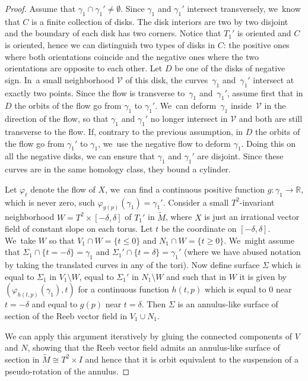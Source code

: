 \documentclass[10pt]{amsart}
\theoremstyle{definition}
\begin{document}
\begin{proof}
Assume that $\gamma_1\cap \gamma_1' \neq \emptyset$. Since $\gamma_1$ and $\gamma_1'$ intersect transversely, we~know that $C$ is a finite collection of disks. The disk interiors are two by two disjoint and the boundary of each disk has two corners. Notice that $T_1'$ is oriented and $C$ is oriented, hence we can distinguish two types of disks in $C$: the positive ones where both orientations coincide and the negative ones where the two orientations are opposite to each other.
Let $D$ be one of the disks of negative sign. In~a small neighborhood $\mathcal{V}$ of this disk, the curves~$\gamma_1$ and~$\gamma_1'$ intersect at exactly two points. Since the flow is transverse to~$\gamma_1$ and~$\gamma_1'$, assume first that in $D$ the orbits of the flow go from $\gamma_1$ to $\gamma_1'$. We~can deform~$\gamma_1$ inside~$\mathcal{V}$ in the direction of the flow, so that $\gamma_1$ and $\gamma_1'$ no longer intersect in $\mathcal{V}$ and both are still transverse to the flow. If, contrary to the previous assumption, in $D$ the orbits of the flow go from $\gamma_1'$ to $\gamma_1$, we~use the negative flow to deform $\gamma_1$. Doing this on all the negative disks,
we can ensure that $\gamma_1$ and $\gamma_1'$ are disjoint. Since these curves are in the same homology class, they bound a cylinder.

Let $\varphi_t$ denote the flow of $X$, we~can find a continuous positive function $g: \gamma_1 \to \mathbb{R}$, which is never zero, such $\varphi_{g(p)}(\gamma_1)=\gamma_1'$. Consider a small $T^2$-invariant neighborhood $W=T^2\times [-\delta,\delta]$ of $T_1'$ in $\widetilde M$, where $X$ is just an irrational vector field of constant slope on each torus. Let $t$ be the coordinate on $[-\delta, \delta]$. We~take $W$ so that $V_1\cap W= \{t\leq 0\}$ and $N_1\cap W=\{t\geq 0\}$. We~might assume that $\Sigma_1\cap \{t=-\delta\}=\gamma_1$ and $\Sigma_1'\cap \{t=\delta\}=\gamma_1'$ (where we have abused notation by taking the translated curves in any of the tori). Now define surface $\Sigma$ which is equal to $\Sigma_1$ in $V_1\setminus W$, equal to $\Sigma_1'$ in $N_1\setminus W$ and such that in $W$ it is given by $(\varphi_{h(t,p)}(\gamma_1),t)$ for a continuous function $h(t,p)$ which is equal to $0$ near $t=-\delta$ and equal to $g(p)$ near $t=\delta$. Then $\Sigma$ is an annulus-like surface of section of the Reeb vector field in $V_1\cup N_1$.

We can apply this argument iteratively by gluing the connected components of $V$ and $N$, showing that the Reeb vector field admits an annulus-like surface of section in $\widetilde{M} \cong T^2\times I$ and hence that it is orbit equivalent to the suspension of a pseudo-rotation of the annulus.
\end{proof}
\end{document}
